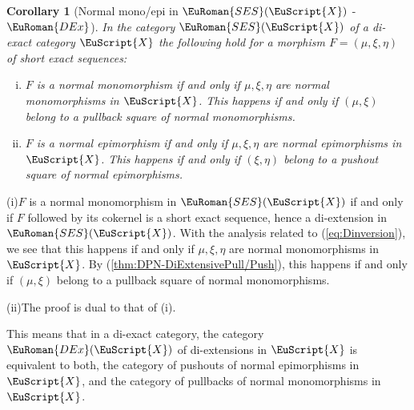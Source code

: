 \documentclass [12pt,oneside]{book}%
\makeatletter
\theoremstyle{captionstyle}  %
\newtheorem{corollary}[theorem]{Corollary}
\renewenvironment{proof}[1][\proofname]{\vspace{-2ex}\par       %
	\pushQED{\qed}%
	\normalfont \topsep6\p@\@plus6\p@\relax
	\trivlist
	\item[\hskip\labelsep
	            \color{proofcaption}\bfseries                %
	            #1\@addpunct{\quad}]\ignorespaces
}{%
	\popQED\endtrivlist\@endpefalse
}
\newenvironment{thmlist}{		%
	\begin{enumerate}[(i)]}{
	\end{enumerate}
}
\newcommand{\Ctgry}[1]{\EuScript{#1}}					%
\newcommand{\SACtgry}[1]{\EuScript{#1}}			%
\newcommand{\SESCat}[1]{\EuRoman{SES}(\Ctgry{#1})}				%
\newcommand{\DExCat}[1]{\EuRoman{DEx}(\EuScript{#1})}							%
\newcommand{\DExTag}{ - {\color{Cerulean} $\EuRoman{DEx}$}}			%
\makeatother
\begin{document}
\begin{corollary}[Normal mono/epi in $\SESCat{X}$\DExTag]
    \label{thm:NormalEpi/Mono-SES(X)-SACat}%
    \label{thm:NormalEpi/Mono-SES(X)-DiExact}%
    In the category $\SESCat{X}$ of a di-exact category $\SACtgry{X}$ the following hold for a morphism $F=(\mu,\xi,\eta)$ of short exact sequences:
    \begin{thmlist}
        \item $F$ is a normal monomorphism if and only if $\mu,\xi,\eta$ are normal monomorphisms in $\Ctgry{X}$. This happens if and only if  $(\mu,\xi)$ belong to a pullback square of normal monomorphisms.
        \item $F$ is a normal epimorphism if and only if $\mu,\xi,\eta$ are normal epimorphisms in $\Ctgry{X}$. This happens if and only if  $(\xi,\eta)$ belong to a pushout square of normal epimorphisms.
    \end{thmlist}
\end{corollary}
\begin{proof}
    (i)\quad $F$ is a normal monomorphism in $\SESCat{X}$ if and only if $F$ followed by its cokernel is a short exact sequence, hence a di-extension in $\SESCat{X}$. With the analysis related to (\ref{eq:Dinversion}), we see that this happens if and only if $\mu,\xi,\eta$ are normal monomorphisms in $\Ctgry{X}$. By (\ref{thm:DPN-DiExtensivePull/Push}),  this happens if and only if  $(\mu,\xi)$ belong to a pullback square of normal monomorphisms.

    (ii)\quad The proof is dual to that of (i).
\end{proof}

This means that in a di-exact category, the category $\DExCat{X}$ of di-extensions in $\Ctgry{X}$ is equivalent to both, the category of pushouts of normal epimorphisms in $\Ctgry{X}$, and the category of pullbacks of normal monomorphisms in $\Ctgry{X}$.
\end{document}
